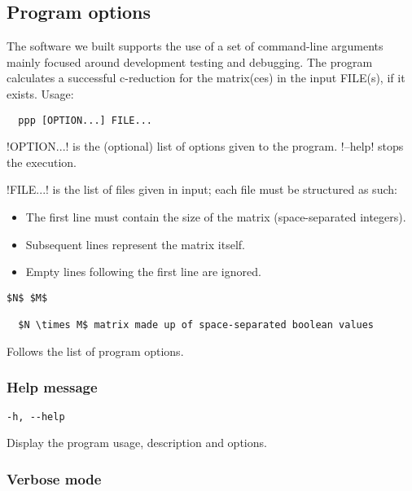 \subsection{Program options}\label{section:program-options}

The software we built supports the use of a set of command-line arguments mainly focused around development testing and debugging.
The program calculates a successful c-reduction for the matrix(ces) in the input FILE(s), if it exists.
Usage:

\begin{lstlisting}
  ppp [OPTION...] FILE...
\end{lstlisting}

!OPTION...! is the (optional) list of options given to the program.
!--help! stops the execution.

!FILE...! is the list of files given in input; each file must be structured as such:

\begin{itemize}
  \item The first line must contain the size of the matrix (space-separated integers).

  \item Subsequent lines represent the matrix itself.

  \item Empty lines following the first line are ignored.
\end{itemize}

\begin{lstlisting}[aboveskip=0pt]
  $N$ $M$

  $N \times M$ matrix made up of space-separated boolean values
\end{lstlisting}

Follows the list of program options.

\subsubsection*{Help message}

\begin{lstlisting}[aboveskip=\smallskipamount]
  -h, --help
\end{lstlisting}

Display the program usage, description and options.

\subsubsection*{Verbose mode}

